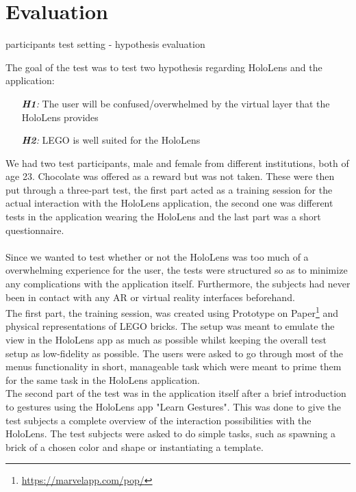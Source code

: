 
\section{Evaluation}

participants
test setting
	- hypothesis
evaluation

The goal of the test was to test two hypothesis regarding HoloLens and the application:
\begin{itemize}
	\item[\textit{\textbf{H1}:}] The user will be confused/overwhelmed by the virtual layer that the HoloLens provides
	\item[\textit{\textbf{H2}:}] LEGO is well suited for the HoloLens
\end{itemize}
We had two test participants, male and female from different institutions, both of age 23. Chocolate was offered as a reward but was not taken. These were then put through a three-part test, the first part acted as a training session for the actual interaction with the HoloLens application, the second one was different tests in the application wearing the HoloLens and the last part was a short questionnaire.\\
\\
Since we wanted to test whether or not the HoloLens was too much of a overwhelming experience for the user, the tests were structured so as to minimize any complications with the application itself. Furthermore, the subjects had never been in contact with any AR or virtual reality interfaces beforehand.\\
The first part, the training session, was created using Prototype on Paper\footnote{\url{https://marvelapp.com/pop/}} and physical representations of LEGO bricks. The setup was meant to emulate the view in the HoloLens app as much as possible whilst keeping the overall test setup as low-fidelity as possible. The users were asked to go through most of the menus functionality in short, manageable task which were meant to prime them for the same task in the HoloLens application.\\
The second part of the test was in the application itself after a brief introduction to gestures using the HoloLens app "Learn Gestures". This was done to give the test subjects a complete overview of the interaction possibilities with the HoloLens. The test subjects were asked to do simple tasks, such as spawning a brick of a chosen color and shape or instantiating a template.\\

